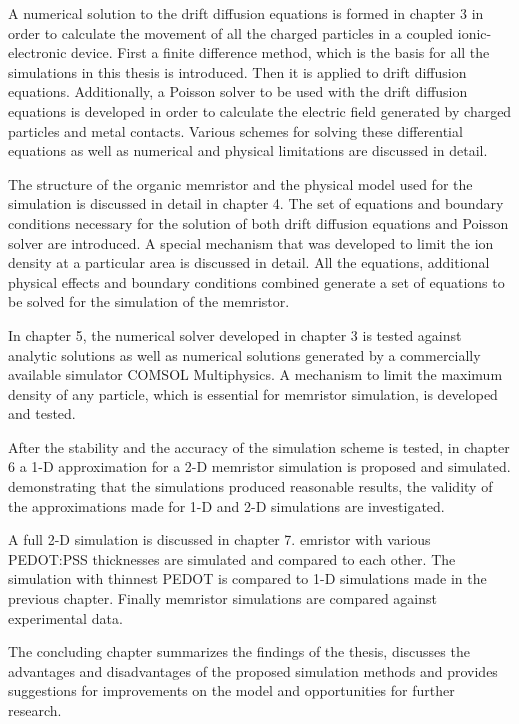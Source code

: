 \begin{doublespace}
A numerical solution to the drift diffusion equations is formed in chapter 3 in order to calculate the movement of all the charged particles in a coupled ionic-electronic device. First a finite difference method, which is the basis for all the simulations in this thesis is introduced. Then it is applied to  drift diffusion equations. Additionally, a Poisson solver to be used with the drift diffusion equations is developed in order to calculate the electric field generated by charged particles and metal contacts. Various schemes for solving these differential equations as well as numerical and physical limitations are discussed in detail.

The structure of the organic memristor and the physical model used for the simulation is discussed in detail in chapter 4. The set of equations and boundary conditions necessary for the solution of both  drift diffusion equations and  Poisson solver are introduced. A special mechanism that was developed to limit the ion density at a particular area is discussed in detail. All the equations, additional physical effects and boundary conditions combined generate a set of equations to be solved for the simulation of the memristor.
 
In chapter 5, the numerical solver developed in chapter 3 is tested against analytic solutions as well as numerical solutions generated by a commercially available simulator \tjs{(}COMSOL Multiphysics\tjs{)}\cite{Comsol}. A mechanism to limit the maximum density of any particle, which is essential for memristor simulation, is developed and tested. 

After the stability and the accuracy of the simulation scheme is tested, in chapter 6 a 1-D approximation for a 2-D memristor simulation is proposed and simulated.  demonstrating that the simulations produced reasonable results, the validity of the approximations made for 1-D and 2-D simulations are investigated.  

A full 2-D simulation is discussed in chapter 7. emristor with various PEDOT:PSS thicknesses are simulated and compared to each other. The simulation with thinnest PEDOT is compared to 1-D simulations made in the previous chapter. Finally memristor simulations are compared against experimental data.

The concluding chapter summarizes the findings of the thesis, discusses the advantages and disadvantages of the proposed simulation methods and provides suggestions for improvements on the model and opportunities for further research.


\end{doublespace}
